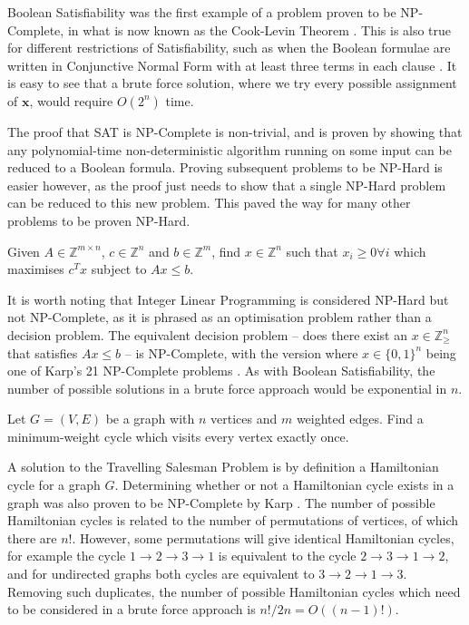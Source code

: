 Boolean Satisfiability was the first example of a problem proven to be NP-Complete, in what is now known as the Cook-Levin Theorem \cite{cook1971}. This is also true for different restrictions of Satisfiability, such as when the Boolean formulae are written in Conjunctive Normal Form with at least three terms in each clause \cite{karp1972}. It is easy to see that a brute force solution, where we try every possible assignment of $\mathbf{x}$, would require $O(2^n)$ time.

The proof that SAT is NP-Complete is non-trivial, and is proven by showing that any polynomial-time non-deterministic algorithm running on some input can be reduced to a Boolean formula. Proving subsequent problems to be NP-Hard is easier however, as the proof just needs to show that a single NP-Hard problem can be reduced to this new problem. This paved the way for many other problems to be proven NP-Hard.

\begin{problem}
Given $A \in \mathbb{Z}^{m\times n}$, $c \in \mathbb{Z}^n$ and $b \in \mathbb{Z}^m$, find $x\in\mathbb{Z}^n$ such that $x_i \geq 0 \forall i$ which maximises $c^Tx$ subject to $Ax \leq b$.
\end{problem}

It is worth noting that Integer Linear Programming is considered NP-Hard but not NP-Complete, as it is phrased as an optimisation problem rather than a decision problem. The equivalent decision problem -- does there exist an $x \in \mathbb{Z}_\geq^n$ that satisfies $Ax \leq b$ -- is NP-Complete, with the version where $x\in\{0,1\}^n$ being one of Karp's 21 NP-Complete problems \cite{karp1972}. As with Boolean Satisfiability, the number of possible solutions in a brute force approach would be exponential in $n$.

\begin{problem}
Let $G = (V,E)$ be a graph with $n$ vertices and $m$ weighted edges. Find a minimum-weight cycle which visits every vertex exactly once.
\end{problem}

A solution to the Travelling Salesman Problem is by definition a Hamiltonian cycle for a graph $G$. Determining whether or not a Hamiltonian cycle exists in a graph was also proven to be NP-Complete by Karp \cite{karp1972}. The number of possible Hamiltonian cycles is related to the number of permutations of vertices, of which there are $n!$. However, some permutations will give identical Hamiltonian cycles, for example the cycle $1\rightarrow2\rightarrow3\rightarrow1$ is equivalent to the cycle  $2\rightarrow3\rightarrow1\rightarrow2$, and for undirected graphs both cycles are equivalent to $3\rightarrow2\rightarrow1\rightarrow3$. Removing such duplicates, the number of possible Hamiltonian cycles which need to be considered in a brute force approach is $n!/2n = O((n-1)!)$.

